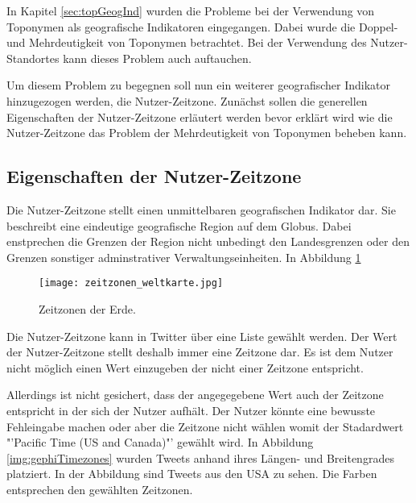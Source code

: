 		In Kapitel \ref{sec:topGeogInd} wurden die Probleme bei der Verwendung von Toponymen als geografische Indikatoren eingegangen.
		Dabei wurde die Doppel- und Mehrdeutigkeit von Toponymen betrachtet.
		Bei der Verwendung des Nutzer-Standortes kann dieses Problem auch auftauchen. 

		Um diesem Problem zu begegnen soll nun ein weiterer geografischer Indikator hinzugezogen werden, die Nutzer-Zeitzone.
		Zunächst sollen die generellen Eigenschaften der Nutzer-Zeitzone erläutert werden bevor erklärt wird wie die Nutzer-Zeitzone das Problem der Mehrdeutigkeit von Toponymen beheben kann.

		\subsection{Eigenschaften der Nutzer-Zeitzone}

			Die Nutzer-Zeitzone stellt einen unmittelbaren geografischen Indikator dar. 
			Sie beschreibt eine eindeutige geografische Region auf dem Globus.
			Dabei enstprechen die Grenzen der Region nicht unbedingt den Landesgrenzen oder den Grenzen sonstiger adminstrativer Verwaltungseinheiten. 
			In Abbildung \ref{img:timezones}

			\begin{figure}[h!]
				\begin{center}
					\texttt{[image: zeitzonen\_weltkarte.jpg]}
					\caption{Zeitzonen der Erde. }

					\label{img:timezones}
				\end{center}
			\end{figure}	

			Die Nutzer-Zeitzone kann in Twitter über eine Liste gewählt werden.
			Der Wert der Nutzer-Zeitzone stellt deshalb immer eine Zeitzone dar.
			Es ist dem Nutzer nicht möglich einen Wert einzugeben der nicht einer Zeitzone entspricht.

			Allerdings ist nicht gesichert, dass der angegegebene Wert auch der Zeitzone entspricht in der sich der Nutzer aufhält.
			Der Nutzer könnte eine bewusste Fehleingabe machen oder aber die Zeitzone nicht wählen womit der Stadardwert "'Pacific Time (US and Canada)"' gewählt wird.
			In Abbildung \ref{img:gephiTimezones} wurden Tweets anhand ihres Längen- und Breitengrades platziert.
			In der Abbildung sind Tweets aus den USA zu sehen. 
			Die Farben entsprechen den gewählten Zeitzonen.

